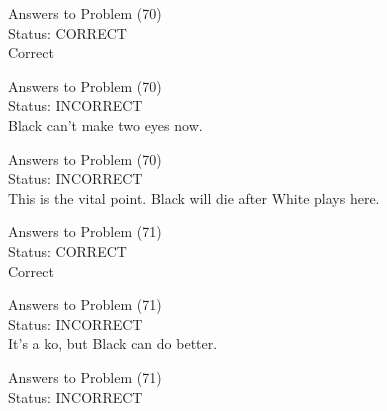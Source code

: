 \documentclass[11pt]{article}
\begin{document}
\begin{minipage}[t]{0.5\textwidth}
  {\centering
  
  Answers to Problem (70)\\
  Status: CORRECT\\
  Correct\\
  }
\end{minipage}
\begin{minipage}[t]{0.5\textwidth}
  {\centering
  
  Answers to Problem (70)\\
  Status: INCORRECT\\
  Black can't make two eyes now.\\
  }
\end{minipage}
\begin{minipage}[t]{0.5\textwidth}
  {\centering
  
  Answers to Problem (70)\\
  Status: INCORRECT\\
  This is the vital point. Black will die after White plays here.\\
  }
\end{minipage}
\begin{minipage}[t]{0.5\textwidth}
  {\centering
  
  Answers to Problem (71)\\
  Status: CORRECT\\
  Correct\\
  }
\end{minipage}
\begin{minipage}[t]{0.5\textwidth}
  {\centering
  
  Answers to Problem (71)\\
  Status: INCORRECT\\
  It's a ko, but Black can do better.\\
  }
\end{minipage}
\begin{minipage}[t]{0.5\textwidth}
  {\centering
  
  Answers to Problem (71)\\
  Status: INCORRECT\\
  
  }
\end{minipage}
\end{document}
